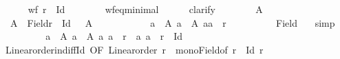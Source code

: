 \begin{isabellebody}
\ \ \ \ \isamarkupfalse%
\ {\isachardoublequoteopen}wf\ {\isacharparenleft}{\kern0pt}r\ {\isacharminus}{\kern0pt}\ Id{\isacharparenright}{\kern0pt}{\isachardoublequoteclose}\isanewline
\ \ \ \ \ \ \isamarkupfalse%
\ wf{\isacharunderscore}{\kern0pt}eq{\isacharunderscore}{\kern0pt}minimal{}\isanewline
\ \ \ \ \isamarkupfalse%
\ clarify\isanewline
\ \ \ \ \ \ \isamarkupfalse%
\ A\isanewline
\ \ \ \ \ \ \isamarkupfalse%
\ {\isacharasterisk}{\kern0pt}{\isacharasterisk}{\kern0pt}{\isacharcolon}{\kern0pt}\ {\isachardoublequoteopen}A\ {\isasymsubseteq}\ Field{\isacharparenleft}{\kern0pt}r\ {\isacharminus}{\kern0pt}\ Id{\isacharparenright}{\kern0pt}{\isachardoublequoteclose}\ \ {\isacharasterisk}{\kern0pt}{\isacharasterisk}{\kern0pt}{\isacharasterisk}{\kern0pt}{\isacharcolon}{\kern0pt}\ {\isachardoublequoteopen}A\ {\isasymnoteq}\ {\isacharbraceleft}{\kern0pt}{\isacharbraceright}{\kern0pt}{\isachardoublequoteclose}\isanewline
\ \ \ \ \ \ \isamarkupfalse%
\ \isamarkupfalse%
\ {\isachardoublequoteopen}{\isasymexists}a\ {\isasymin}\ A{\isachardot}{\kern0pt}\ {\isasymforall}a{\isacharprime}{\kern0pt}\ {\isasymin}\ A{\isachardot}{\kern0pt}\ {\isacharparenleft}{\kern0pt}a{\isacharcomma}{\kern0pt}a{\isacharprime}{\kern0pt}{\isacharparenright}{\kern0pt}\ {\isasymin}\ r{\isachardoublequoteclose}\isanewline
\ \ \ \ \ \ \ \ \isamarkupfalse%
\ Field\ {\isacharasterisk}{\kern0pt}\ \isamarkupfalse%
\ simp\isanewline
\ \ \ \ \ \ \isamarkupfalse%
\ \isamarkupfalse%
\ {\isachardoublequoteopen}{\isasymforall}a\ {\isasymin}\ A{\isachardot}{\kern0pt}\ {\isasymforall}a{\isacharprime}{\kern0pt}\ {\isasymin}\ A{\isachardot}{\kern0pt}\ {\isacharparenleft}{\kern0pt}a{\isacharcomma}{\kern0pt}\ a{\isacharprime}{\kern0pt}{\isacharparenright}{\kern0pt}\ {\isasymin}\ r\ {\isasymlongleftrightarrow}\ {\isacharparenleft}{\kern0pt}a{\isacharprime}{\kern0pt}{\isacharcomma}{\kern0pt}\ a{\isacharparenright}{\kern0pt}\ {\isasymnotin}\ r\ {\isacharminus}{\kern0pt}\ Id{\isachardoublequoteclose}\isanewline
\ \ \ \ \ \ \ \ \isamarkupfalse%
\ Linear{\isacharunderscore}{\kern0pt}order{\isacharunderscore}{\kern0pt}in{\isacharunderscore}{\kern0pt}diff{\isacharunderscore}{\kern0pt}Id\ {\isacharbrackleft}{\kern0pt}OF\ {\isacartoucheopen}Linear{\isacharunderscore}{\kern0pt}order\ r{\isacartoucheclose}{\isacharbrackright}{\kern0pt}\ {\isacharasterisk}{\kern0pt}{\isacharasterisk}{\kern0pt}\ mono{\isacharunderscore}{\kern0pt}Field{\isacharbrackleft}{\kern0pt}of\ {\isachardoublequoteopen}r\ {\isacharminus}{\kern0pt}\ Id{\isachardoublequoteclose}\ r{\isacharbrackright}{\kern0pt}\ \isamarkupfalse%

\end{isabellebody}
